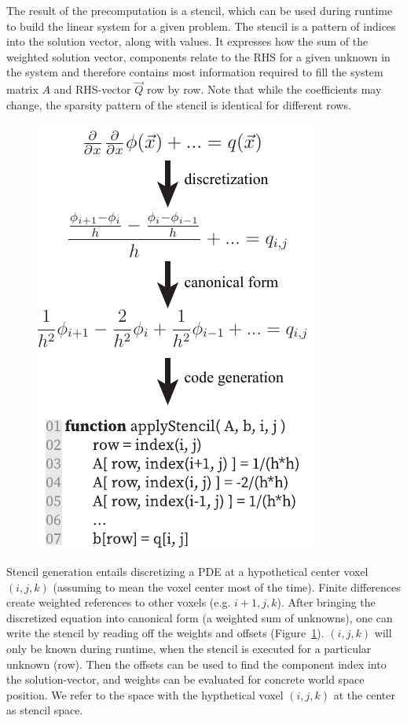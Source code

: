 The result of the precomputation is a stencil, which can be used during runtime to build the linear system for a given problem. The stencil is a pattern of indices into the solution vector, along with values. It expresses how the sum of the weighted solution vector, components relate to the RHS for a given unknown in the system and therefore contains most information required to fill the system matrix $A$ and RHS-vector $\vec{Q}$ row by row. Note that while the coefficients may change, the sparsity pattern of the stencil is identical for different rows.

\begin{figure}[b]
\centering
\includegraphics[width=0.7\columnwidth]{figures/fig_stencil_pipeline.pdf}
\label{fig:stencile_pipeline}
\end{figure}

Stencil generation entails discretizing a PDE at a hypothetical center voxel $(i, j, k)$ (assuming to mean the voxel center most of the time). Finite differences create weighted references to other voxels (e.g. $i+1, j, k$). After bringing the discretized equation into canonical form (a weighted sum of unknowns), one can write the stencil by reading off the weights and offsets (Figure~\ref{fig:stencile_pipeline}). $(i, j, k)$ will only be known during runtime, when the stencil is executed for a particular unknown (row). Then the offsets can be used to find the component index into the solution-vector, and weights can be evaluated for concrete world space position. We refer to the space with the hypthetical voxel $(i, j, k)$ at the center as stencil space.

